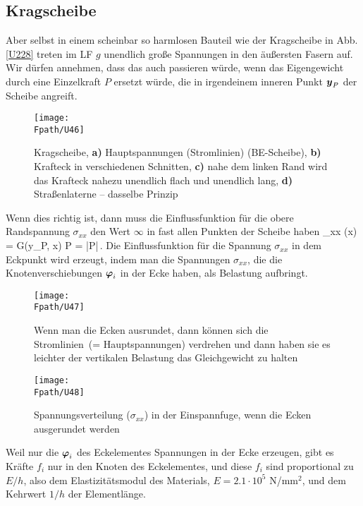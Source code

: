 {{%
{\textcolor{sectionTitleBlue}{\subsection{Kragscheibe}}}
Aber selbst in einem scheinbar so harmlosen Bauteil wie der Kragscheibe in Abb. \ref{U228} treten im LF $g$ unendlich gro{\ss}e Spannungen in den \"{a}u{\ss}ersten Fasern auf. Wir d\"{u}rfen annehmen, dass das auch passieren w\"{u}rde, wenn das Eigengewicht durch eine Einzelkraft $P$ ersetzt w\"{u}rde, die in irgendeinem inneren Punkt $\mbox{\boldmath $y$}_P$ der Scheibe angreift.
\begin{figure}
\centering
{\texttt{[image: \\Fpath/U46]}}
\caption{Kragscheibe, \textbf{ a)} Hauptspannungen (\glq Stromlinien\grq) (BE-Scheibe), \textbf{ b)} Krafteck in verschiedenen Schnitten, \textbf{ c)} nahe dem linken Rand wird das Krafteck nahezu unendlich flach und unendlich lang, \textbf{ d)} Stra{\ss}enlaterne -- dasselbe Prinzip }
\label{U46}%
\end{figure}%

Wenn dies richtig ist, dann muss die Einflussfunktion f\"{u}r die obere Randspannung $\sigma_{xx}$ den Wert $\infty $ in fast allen Punkten der Scheibe haben
\beq
\sigma_{xx} (\vek x) = \textcolor{chapterTitleBlue}{\vek G(\vek y_P, \vek x) }\dotprod  \vek P = \textcolor{chapterTitleBlue}{\vek \infty} \cdot  |\vek P|\,.
\eeq
Die Einflussfunktion f\"{u}r die Spannung $\sigma_{xx}$ in dem Eckpunkt wird erzeugt, indem man die Spannungen $\sigma_{xx}$, die die Knotenverschiebungen $\mbox{\boldmath $\varphi$}_i$ in der Ecke haben, als Belastung aufbringt.
\begin{figure}
\centering
{\texttt{[image: \\Fpath/U47]}}
\caption{Wenn man die Ecken ausrundet, dann k\"{o}nnen sich die \glq Stromlinien\grq\ (= Hauptspannungen) verdrehen und dann haben sie es leichter der vertikalen Belastung das Gleichgewicht zu halten}
\label{U47}%
\end{figure}%
\begin{figure}
\centering
\texttt{[image: \\Fpath/U48]}
\caption{Spannungsverteilung ($\sigma_{xx}$) in der Einspannfuge, wenn die Ecken ausgerundet werden}
\label{U48}%
\end{figure}%
Weil nur die $\mbox{\boldmath $\varphi$}_i$ des Eckelementes Spannungen in der Ecke erzeugen, gibt es Kr\"{a}fte $f_i$ nur in den Knoten des Eckelementes, und diese $f_i$ sind proportional zu $E/h$, also dem Elastizit\"{a}tsmodul des Materials, $E = 2.1 \cdot 10^5$ N/mm$^2$, und dem Kehrwert $1/h$ der Elementl\"{a}nge.

}}
